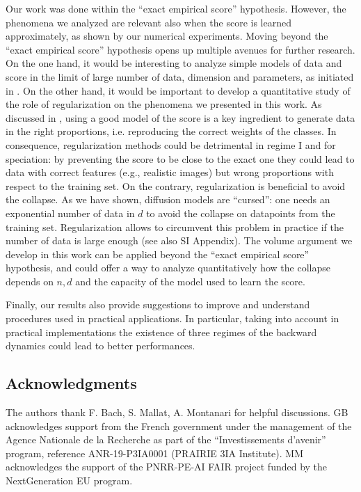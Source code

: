 \documentclass[10pt,twocolumn]{article}
\begin{document}
Our work was done within the ``exact empirical score'' hypothesis. However, the phenomena we analyzed are relevant also when the score is learned approximately, as shown by our numerical experiments. Moving beyond the ``exact empirical score'' hypothesis opens up multiple avenues for further research. On the one hand, it would be interesting to analyze simple models of data and score in the limit of large number of data, dimension and parameters, as initiated in \cite{GBM,cui2023analysis}. On the other hand, it would be important to develop a quantitative study of the role of regularization on the phenomena we presented in this work. As discussed in \cite{GBM}, using a good model of the score is a key ingredient to generate data in the right proportions, i.e. reproducing the correct weights of the classes. In consequence, regularization methods could be detrimental in regime I and for speciation: by preventing the score to be close to the exact one they could lead to data with correct features (e.g., realistic images) but wrong proportions with respect to the training set. 
On the contrary, regularization is beneficial to avoid the collapse. As we have shown, diffusion models are ``cursed'': one needs an exponential number of data in $d$ to avoid the collapse on datapoints from the training set. Regularization allows to circumvent this problem in practice if the number of data is large enough \cite{kadkhodaie2023generalization} (see also SI Appendix). The volume argument we develop in this work can be applied beyond the ``exact empirical score'' hypothesis, and could offer a way to analyze quantitatively how the collapse depends on $n,d$ and the capacity of the model used to learn the score. 

Finally, our results also provide suggestions to improve and understand procedures used in practical applications. In particular, taking into account in practical implementations the existence of three regimes of the backward dynamics could lead to better performances.

\subsection*{Acknowledgments}
The authors thank F. Bach, S. Mallat, A. Montanari for helpful discussions. GB acknowledges support from the French government under the management of the Agence Nationale de la Recherche as part of the “Investissements d’avenir” program, reference ANR-19-P3IA0001 (PRAIRIE 3IA Institute). MM acknowledges the support of the PNRR-PE-AI FAIR project funded by the NextGeneration EU program.
\end{document}
